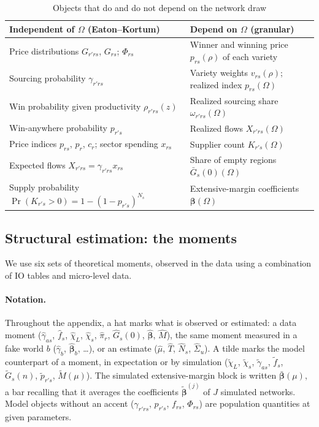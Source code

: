  
\begin{table}[htbp]
\centering
\caption{Objects that do and do not depend on the network draw}
\label{tab:app-draw}
\begin{tabular}{p{}p{}}
\hline
\textbf{Independent of $\Omega$ (Eaton--Kortum)} & \textbf{Depend on $\Omega$ (granular)} \\
\hline
Price distributions $G_{r'rs}$, $G_{rs}$; $\Phi_{rs}$ & Winner and winning price $p_{rs}(\rho)$ of each variety \\
Sourcing probability $\gamma_{r'rs}$ & Variety weights $v_{rs}(\rho)$; realized index $p_{rs}(\Omega)$ \\
Win probability given productivity $\rho_{r'rs}(z)$ & Realized sourcing share $\omega_{r'rs}(\Omega)$ \\
Win-anywhere probability $p_{r's}$ & Realized flows $X_{r'rs}(\Omega)$ \\
Price indices $p_{rs}$, $p_r$, $c_r$; sector spending $x_{rs}$ & Supplier count $K_{r's}(\Omega)$ \\
Expected flows $X_{r'rs}=\gamma_{r'rs}x_{rs}$ & Share of empty regions $\bar G_s(0)(\Omega)$ \\
Supply probability $\Pr(K_{r's}>0)=1-(1-p_{r's})^{N_s}$ & Extensive-margin coefficients $\boldsymbol\beta(\Omega)$ \\
\hline
\end{tabular}
\end{table}



\subsection{Structural estimation: the moments}
\label{app:model-moments}

We use six sets of theoretical moments, observed in the data using a combination of IO tables and micro-level data.

\paragraph{Notation.} Throughout the appendix, a hat marks what is observed or estimated: a data moment ($\hat\gamma_{as}$, $\hat f_s$, $\hat\chi_L$, $\hat\chi_s$, $\hat\pi_r$, $\hat G_s(0)$, $\hat{\boldsymbol\beta}$, $\hat M$), the same moment measured in a fake world $b$ ($\hat\gamma_b$, $\hat{\boldsymbol\beta}_b$, \dots), or an estimate ($\hat\mu$, $\hat T$, $\hat N_s$, $\hat\Sigma_u$). A tilde marks the model counterpart of a moment, in expectation or by simulation ($\tilde\chi_L$, $\tilde\chi_s$, $\tilde\gamma_{as}$, $\tilde f_s$, $\tilde G_s(n)$, $\tilde p_{r's}$, $\tilde M(\mu)$). The simulated extensive-margin block is written $\bar{\boldsymbol\beta}(\mu)$, a bar recalling that it averages the coefficients $\tilde{\boldsymbol\beta}^{(j)}$ of $J$ simulated networks. Model objects without an accent ($\gamma_{r'rs}$, $p_{r's}$, $f_{rs}$, $\Phi_{rs}$) are population quantities at given parameters.

